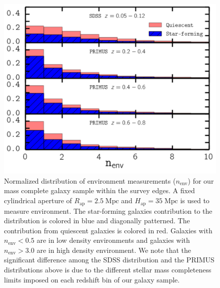 \documentclass{emulateapj}
\def \apradius{2.5}
\def \apheight{35}
\begin{document}
\begin{figure}
  \begin{center}
    \leavevmode
    \includegraphics[scale=0.48]{fig2.pdf}
    \caption{Normalized distribution of environment measurements ($n_{\mathrm{env}}$) for our mass complete galaxy sample within the survey edges. A fixed cylindrical aperture of $R_{\mathrm{ap}} =\apradius\;\mathrm{Mpc}$ and $H_{\mathrm{ap}} = \apheight\; \mathrm{Mpc}$ is used to measure environment. The star-forming galaxies contribution to the distribution is colored in blue and diagonally patterned. The contribution from quiescent galaxies is colored in red. Galaxies with $n_{\mathrm{env}} < 0.5$ are in low density environments and galaxies with $n_{\mathrm{env}} > 3.0$ are in high density environment. We note that the significant difference among the SDSS distribution and the PRIMUS distributions above is due to the different stellar mass completeness limits imposed on each redshift bin of our galaxy sample.}      \label{fig:envcount}
    \end{center}
\end{figure}
\end{document}
